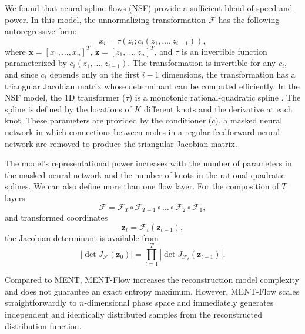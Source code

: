 \documentclass[%
    reprint,
    twocolumn,
    nofootinbib,
    amsmath,
    amssymb,
    aps,
    prstab,
]{revtex4-2}
\newcommand{\vect}[1]{\boldsymbol{\mathbf{#1}}}
\begin{document}
We found that neural spline flows (NSF) \cite{Durkan_2019} provide a sufficient blend of speed and power. In this model, the unnormalizing transformation $\mathcal{F}$ has the following autoregressive form:
%
\begin{equation}
    x_i = \tau (z_i; c_i(z_1, \dots, z_{i -1})),
\end{equation}
%
where $\vect{x} = [x_1, \dots , x_n]^T$, $\vect{z} = [z_1, \dots , z_n]^T$, and $\tau$ is an invertible function parameterized by $c_i(z_1, \dots, z_{i -1})$. The transformation is invertible for any $c_i$, and since $c_i$ depends only on the first $i - 1$ dimensions, the transformation has a triangular Jacobian matrix whose determinant can be computed efficiently. In the NSF model, the 1D transformer ($\tau$) is a monotonic rational-quadratic spline \cite{Durkan_2019}. The spline is defined by the locations of $K$ different knots and the derivative at each knot. These parameters are provided by the conditioner ($c$), a masked neural network \cite{Papamakarios_2017} in which connections between nodes in a regular feedforward neural network are removed to produce the triangular Jacobian matrix.

The model's representational power increases with the number of parameters in the masked neural network and the number of knots in the rational-quadratic splines. We can also define more than one flow layer. For the composition of $T$ layers
%
\begin{equation}
    \mathcal{F} = \mathcal{F}_T \circ \mathcal{F}_{T-1} \circ \dots \circ \mathcal{F}_{2} \circ \mathcal{F}_1,
\end{equation}
%
and transformed coordinates
%
\begin{equation}
    \vect{z}_t = \mathcal{F}_{t} (\vect{z}_{t - 1}),
\end{equation}
%
the Jacobian determinant is available from
%
\begin{equation}
    \left| \det J_{\mathcal{F}}(\vect{z}_0) \right| =
    \prod_{t=1}^T {
        \left| \det J_{\mathcal{F}_t}(\vect{z}_{t - 1}) \right|.
    }
\end{equation}
%

Compared to MENT, MENT-Flow increases the reconstruction model complexity and does not guarantee an exact entropy maximum. However, MENT-Flow scales straightforwardly to $n$-dimensional phase space and immediately generates independent and identically distributed samples from the reconstructed distribution function.
\end{document}
